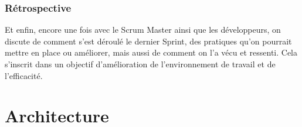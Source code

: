 \documentclass[12pt, a4paper]{report}
\begin{document}
            \subsubsection{Rétrospective}
                Et enfin, encore une fois avec le Scrum Master ainsi que les développeurs, on discute de comment s'est déroulé le dernier Sprint, des pratiques qu'on pourrait mettre en place ou améliorer, mais aussi de comment on l'a vécu et ressenti.\newline
                Cela s'inscrit dans un objectif d'amélioration de l'environnement de travail et de l'efficacité.
    \section{Architecture}
        \begin{figure}[H]
            \begin{center}
\end{center}
\end{figure}
\end{document}
